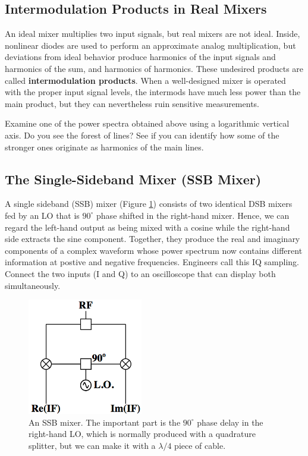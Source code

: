 \documentclass[11pt,preprint]{aastex}
\begin{document}
\subsection{Intermodulation Products in Real Mixers}

\noindent
An ideal mixer multiplies two input
signals, but real mixers are not ideal. Inside,
nonlinear diodes are used to perform an approximate analog multiplication, but
deviations from ideal behavior 
produce harmonics of the input signals and harmonics of the sum, and harmonics
of harmonics.
These undesired products are called
{\bf intermodulation products}.
When a well-designed
mixer is operated with the proper input signal levels, the intermods
have much less power than the main product, but they can nevertheless
ruin sensitive measurements.

Examine one of the power spectra obtained above using a logarithmic vertical
axis.
Do you see the forest of lines?
See if you can identify how some of the
stronger ones originate as harmonics of the main lines.

\subsection{ The Single-Sideband Mixer (SSB Mixer)}
\label{sectssb}

\noindent
A single sideband (SSB) mixer (Figure \ref{ssb}) 
consists of two identical
DSB mixers fed by an LO that is $90^\circ$ phase shifted in the right-hand mixer.
Hence, we can regard the left-hand output as being mixed with a cosine while
the right-hand side extracts the sine component.
Together, they produce the real and imaginary components of a complex waveform
whose power spectrum now contains different information
at postive and negative frequencies.
Engineers call this IQ sampling. Connect the two inputs
(I and Q) to an oscilloscope that can display both simultaneously.

\begin{figure}[h!]
\begin{center}
  \includegraphics[height=2in]{ssbmixer.png}
\end{center}
\caption{\footnotesize An SSB mixer. The important part is the
  $90^\circ$ phase delay in the right-hand LO, which is normally
  produced with a quadrature splitter, but we can make it
  with a $\lambda/4$ piece of cable. \label{ssb}}
\end{figure}
\end{document}
